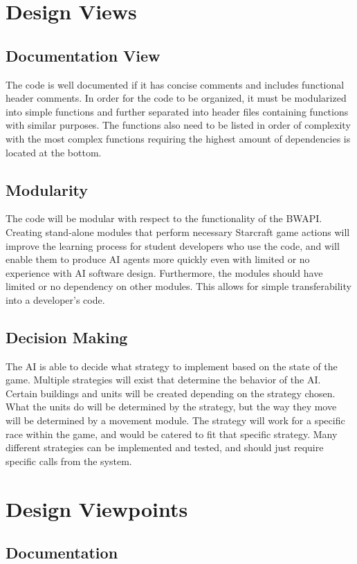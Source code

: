 \documentclass[10pt,letterpaper,onecolumn,draftclsnofoot]{IEEEtran}
\begin{document}
\section{Design Views}
\subsection{Documentation View}
	The code is well documented if it has concise comments and includes functional header comments. In order for the code to be organized, it must be modularized into simple functions and further separated into header files containing functions with similar purposes. The functions also need to be listed in order of complexity with the most complex functions requiring the highest amount of dependencies is located at the bottom.
\subsection{Modularity}
	The code will be modular with respect to the functionality of the BWAPI. Creating stand-alone modules that perform necessary Starcraft game actions will improve the learning process for student developers who use the code, and will enable them to produce AI agents more quickly even with limited or no experience with AI software design. Furthermore, the modules should have limited or no dependency on other modules. This allows for simple transferability into a developer's code. 
\subsection{Decision Making}
The AI is able to decide what strategy to implement based on the state of the game. Multiple strategies will exist that determine the behavior of the AI. Certain buildings and units will be created depending on the strategy chosen. What the units do will be determined by the strategy, but the way they move will be determined by a movement module. The strategy will work for a specific race within the game, and would be catered to fit that specific strategy. Many different strategies can be implemented and tested, and should just require specific calls from the system.
\section{Design Viewpoints}
\subsection{Documentation}
\end{document}
